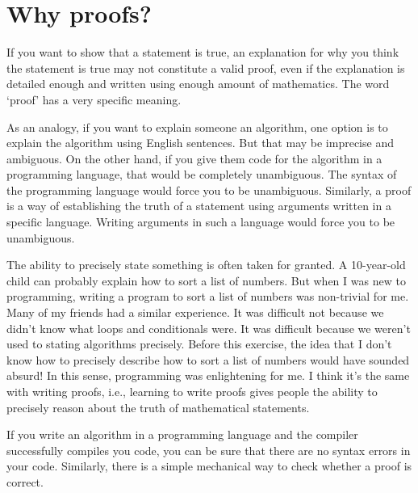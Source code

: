 \section{Why proofs?}

If you want to show that a statement is true, an explanation for why you think
the statement is true may not constitute a valid proof,
even if the explanation is detailed enough and
written using enough amount of mathematics.
The word `proof' has a very specific meaning.

As an analogy, if you want to explain someone an algorithm,
one option is to explain the algorithm using English sentences.
But that may be imprecise and ambiguous.
On the other hand, if you give them code for the algorithm in a
programming language, that would be completely unambiguous.
The syntax of the programming language would force you to be unambiguous.
Similarly, a proof is a way of establishing the truth of a statement
using arguments written in a specific language.
Writing arguments in such a language would force you to be unambiguous.

The ability to precisely state something is often taken for granted.
A 10-year-old child can probably explain how to sort a list of numbers.
But when I was new to programming, writing a program to sort a list of numbers
was non-trivial for me. Many of my friends had a similar experience.
It was difficult not because we didn't know what loops and conditionals were.
It was difficult because we weren't used to stating algorithms precisely.
Before this exercise, the idea that I don't know how to precisely describe
how to sort a list of numbers would have sounded absurd!
In this sense, programming was enlightening for me.
I think it's the same with writing proofs, i.e.,
learning to write proofs gives people the ability
to precisely reason about the truth of mathematical statements.

If you write an algorithm in a programming language and
the compiler successfully compiles you code,
you can be sure that there are no syntax errors in your code.
Similarly, there is a simple mechanical way to check whether a proof is correct.

\begin{comment}
In fact, there are computer programs, like \href{https://coq.inria.fr/}{Coq},
that can validate your proofs if they're written in a certain proof language.
If such a program says that your proof is correct,
you can be absolutely sure that your proof is correct.
\end{comment}

